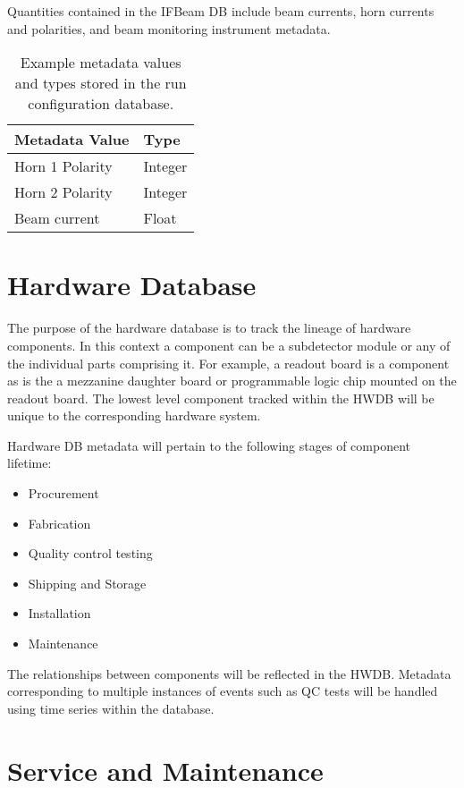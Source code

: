Quantities contained in the IFBeam DB include beam currents, horn currents and polarities, and beam monitoring instrument metadata.

\begin{table}[h!]
\centering
 \begin{tabular}{||l| l ||} 
 \hline
 Metadata Value & Type  \\ [0.5ex] 
 \hline\hline
Horn 1 Polarity &  Integer \\ \hline
Horn 2 Polarity  & Integer  \\ \hline
Beam current & Float \\ [1ex] 
\hline
\end{tabular}
\caption{Example metadata values and types stored in the run configuration database.}
\label{table:ifbeam}
\end{table}

\section{Hardware Database}
\label{sec:db:hwdb}  

The purpose of the hardware database is to track the lineage of hardware components. In this context a component can be a subdetector module or any of the individual parts comprising it. For example, a readout board is a component as is the a mezzanine daughter board or programmable logic chip mounted on the readout board. The lowest level component tracked within the HWDB will be unique to the corresponding hardware system.

Hardware DB metadata will pertain to the following stages of component lifetime:

\begin{itemize}
\item Procurement 
\item Fabrication
\item Quality control testing
\item Shipping and Storage
\item Installation
\item Maintenance 
\end{itemize}

The relationships between components will be reflected in the HWDB. Metadata corresponding to multiple instances of events such as QC tests will be handled using time series within the database. 

\section{Service and Maintenance}
\label{sec:db:service}  